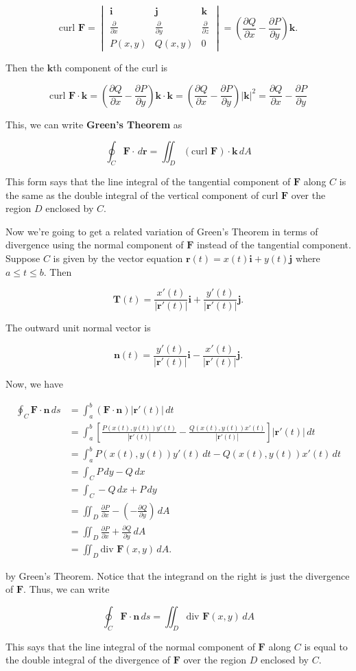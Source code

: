 \documentclass[11pt,oneside,english]{amsart}
\theoremstyle{definition}
\newcommand{\pp}[2]{\frac{\partial{#1}}{\partial{#2}}}
\begin{document}
\[
\text{curl }\mathbf{F}=\begin{vmatrix}\mathbf{i} & \mathbf{j} & \mathbf{k}\\\pp{}{x} & \pp{}{y} & \pp{}{z}\\ P(x,y) & Q(x,y) & 0\end{vmatrix}=\left(\pp{Q}{x}-\pp{P}{y}\right)\mathbf{k}.
\]

Then the $\mathbf{k}$th component of the curl is

\[
\text{curl }\mathbf{F}\cdot\mathbf{k}=\left(\pp{Q}{x}-\pp{P}{y}\right)\mathbf{k}\cdot\mathbf{k}=\left(\pp{Q}{x}-\pp{P}{y}\right)|\mathbf{k}|^2=\pp{Q}{x}-\pp{P}{y}
\]

This, we can write \textbf{Green's Theorem} as 

\[\boxed{
\oint_C\mathbf{F}\cdot\,d\mathbf{r}=\iint_D(\text{curl }\mathbf{F})\cdot\mathbf{k}\,dA}
\]

This form says that the line integral of the tangential component of $\mathbf{F}$ along $C$ is the same as the double integral of the vertical component of curl $\mathbf{F}$ over the region $D$ enclosed by $C$.

Now we're going to get a related variation of Green's Theorem in terms of divergence using the normal component of $\mathbf{F}$ instead of the tangential component. Suppose $C$ is given by the vector equation $\mathbf{r}(t)=x(t)\mathbf{i}+y(t)\mathbf{j}$ where $a\leq t\leq b$. Then

\[
\mathbf{T}(t)=\frac{x'(t)}{|\mathbf{r}'(t)|}\mathbf{i}+\frac{y'(t)}{|\mathbf{r}'(t)|}\mathbf{j}.
\]

The outward unit normal vector is

\[
\mathbf{n}(t)=\frac{y'(t)}{|\mathbf{r}'(t)|}\mathbf{i}-\frac{x'(t)}{|\mathbf{r}'(t)|}\mathbf{j}.
\]

Now, we have

\begin{align*}
\oint_C\mathbf{F}\cdot\mathbf{n}\,ds&=\int_a^b(\mathbf{F}\cdot\mathbf{n})|\mathbf{r}'(t)|\,dt\\[2mm]
&=\int_a^b\left[\frac{P(x(t),y(t))y'(t)}{|\mathbf{r}'(t)|}-\frac{Q(x(t),y(t))x'(t)}{|\mathbf{r}'(t)|}\right]|\mathbf{r}'(t)|\,dt\\[2mm]
&=\int_a^bP(x(t),y(t))y'(t)\,dt-Q(x(t),y(t))x'(t)\,dt\\[2mm]
&=\int_CP\,dy-Q\,dx\\[2mm]
&=\int_C-Q\,dx+P\,dy\\[2mm]
&=\iint_D\pp{P}{x}-\left(-\pp{Q}{y}\right)\,dA\\[2mm]
&=\iint_D\pp{P}{x}+\pp{Q}{y}\,dA\\[2mm]
&=\iint_D\text{div }\mathbf{F}(x,y)\,dA.
\end{align*}

by Green's Theorem. Notice that the integrand on the right is just the divergence of $\mathbf{F}$. Thus, we can write

\[\boxed{
\oint_C\mathbf{F}\cdot\mathbf{n}\,ds=\iint_D\text{div }\mathbf{F}(x,y)\,dA}
\]

This says that the line integral of the normal component of $\mathbf{F}$ along $C$ is equal to the double integral of the divergence of $\mathbf{F}$ over the region $D$ enclosed by $C$.
\end{document}
